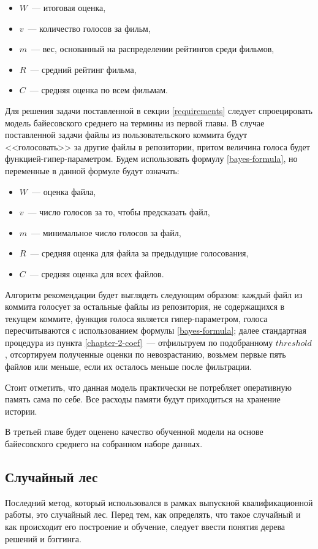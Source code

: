     \begin{itemize}
        \item $W$~--- итоговая оценка,
        \item $v$~--- количество голосов за фильм,
        \item $m$~--- вес, основанный на распределении рейтингов среди фильмов,
        \item $R$~--- средний рейтинг фильма,
        \item ${C}$~--- средняя оценка по всем фильмам.
    \end{itemize}

Для решения задачи поставленной в секции \ref{requirements} следует спроецировать модель байесовского среднего на термины из первой главы. В случае поставленной задачи файлы из пользовательского коммита будут <<голосовать>> за другие файлы в репозитории, притом величина голоса будет функцией-гипер-параметром. Будем использовать формулу \ref{bayes-formula}, но переменные в данной формуле будут означать:
\begin{itemize}
    \item $W$~--- оценка файла,
    \item $v$~--- число голосов за то, чтобы предсказать файл,
    \item $m$~--- минимальное число голосов за файл,
    \item $R$~--- средняя оценка для файла за предыдущие голосования,
    \item ${C}$~--- средняя оценка для всех файлов.
\end{itemize}

Алгоритм рекомендации будет выглядеть следующим образом: каждый файл из коммита голосует за остальные файлы из репозитория, не содержащихся в текущем коммите, функция голоса является гипер-параметром, голоса пересчитываются с использованием формулы \ref{bayes-formula}; далее стандартная процедура из пункта \ref{chapter-2-coef}~--- отфильтруем по подобранному $threshold$, отсортируем полученные оценки по невозрастанию, возьмем первые пять файлов или меньше, если их осталось меньше после фильтрации.

Стоит отметить, что данная модель практически не потребляет оперативную память сама по себе. Все расходы памяти будут приходиться на хранение истории.

В третьей главе будет оценено качество обученной модели на основе байесовского среднего на собранном наборе данных.
    \subsection{Случайный лес}\label{chapter2-forest}
Последний метод, который использовался в рамках выпускной квалификационной работы, это случайный лес. Перед тем, как определять, что такое случайный и как происходит его построение и обучение, следует ввести понятия дерева решений и бэггинга.

